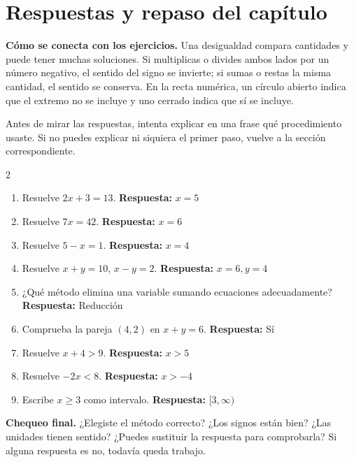 \documentclass[10pt,oneside,openany]{book}
\begin{document}
\section{Respuestas y repaso del capítulo}

\textbf{Cómo se conecta con los ejercicios.} Una desigualdad compara cantidades y puede tener muchas soluciones. Si multiplicas o divides ambos lados por un número negativo, el sentido del signo se invierte; si sumas o restas la misma cantidad, el sentido se conserva. En la recta numérica, un círculo abierto indica que el extremo no se incluye y uno cerrado indica que sí se incluye.

Antes de mirar las respuestas, intenta explicar en una frase qué procedimiento usaste. Si no puedes explicar ni siquiera el primer paso, vuelve a la sección correspondiente.

\begin{multicols}{2}\begin{enumerate}

\item Resuelve $2x+3=13$. \textbf{Respuesta:} $x=5$

\item Resuelve $7x=42$. \textbf{Respuesta:} $x=6$

\item Resuelve $5-x=1$. \textbf{Respuesta:} $x=4$

\item Resuelve $x+y=10$, $x-y=2$. \textbf{Respuesta:} $x=6,y=4$

\item ¿Qué método elimina una variable sumando ecuaciones adecuadamente? \textbf{Respuesta:} Reducción

\item Comprueba la pareja $(4,2)$ en $x+y=6$. \textbf{Respuesta:} Sí

\item Resuelve $x+4>9$. \textbf{Respuesta:} $x>5$

\item Resuelve $-2x<8$. \textbf{Respuesta:} $x>-4$

\item Escribe $x\geq3$ como intervalo. \textbf{Respuesta:} $[3,\infty)$

\end{enumerate}\end{multicols}

\begin{idea}\textbf{Chequeo final.} ¿Elegiste el método correcto? ¿Los signos están bien? ¿Las unidades tienen sentido? ¿Puedes sustituir la respuesta para comprobarla? Si alguna respuesta es no, todavía queda trabajo.\end{idea}
\end{document}

